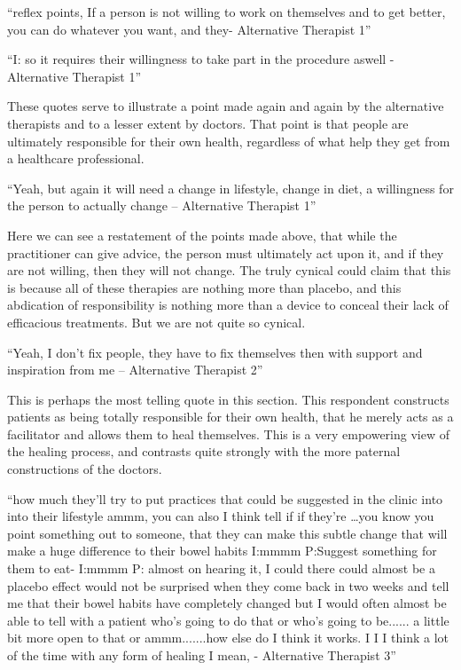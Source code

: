 ``reflex points, If a person is not willing to work on themselves and to get better, you can do whatever you want, and they- Alternative Therapist 1''

``I: so it requires their willingness to take part in the procedure aswell - Alternative Therapist 1''

These quotes serve to illustrate a point made again and again by the alternative therapists and to a lesser extent by doctors. That point is that people are ultimately responsible for their own health, regardless of what help they get from a healthcare professional. 

``Yeah, but again it will need a change in lifestyle, change in diet, a willingness for the person to actually change – Alternative Therapist 1''

Here we can see a restatement of the points made above, that while the practitioner can give advice, the person must ultimately act upon it, and if they are not willing, then they will not change. The truly cynical could claim that this is because all of these therapies are nothing more than placebo, and this abdication of responsibility is nothing more than a device to conceal their lack of efficacious treatments. But we are not quite so cynical. 

``Yeah, I don't fix people, they have to fix themselves then with support and inspiration from me – Alternative Therapist 2''

This is perhaps the most telling quote in this section. This respondent constructs patients as being totally responsible for their own health, that he merely acts as a facilitator and allows them to heal themselves. This is a very empowering view of the healing process, and contrasts quite strongly with the more paternal constructions of the doctors. 

``how much they'll try to put practices that could be suggested in the clinic into into their lifestyle ammm, you can also I think tell if if they're \ldots you know you point something out to someone, that they can make this subtle  change that will make a huge difference to their bowel habits  
I:mmmm
P:Suggest something for them to eat-
I:mmmm
P: almost on hearing it, I could there could almost be a placebo effect would not be surprised when they come back in two weeks and tell me that their bowel habits have completely changed but I would often almost be able to tell with a patient who's going to do that or who's going to be...... a little bit more open to that or ammm.......how else do I think it works. I I I think a lot of the time with any form of healing I mean, - Alternative Therapist 3''

